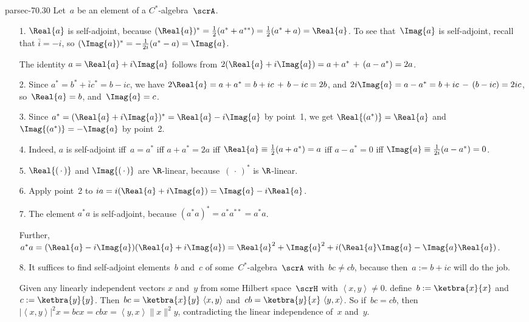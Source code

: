 \documentclass[b5page]{book}
\begin{document}
\begin{solution}{parsec-70.30}
Let~$a$ be an element of a $C^*$-algebra~$\scrA$.
\begin{enumerate}
    \item[1.]
$\Real{a}$ is self-adjoint, because
$(\Real{a})^*
        = \frac{1}{2}(a^{*}+a^{**}) = \frac{1}{2}(a^*+a) = \Real{a}$.
To see that~$\Imag{a}$ is self-adjoint, recall
        that $\bar{i}=-i$,
so
        $(\Imag{a})^*
        = -\frac{1}{2i}(a^*-a) 
        = \Imag{a}$.

The identity $a=\Real{a}+i\Imag{a}$
follows from
        $2(\Real{a}+i\Imag{a})
        = a+a^* \,+\, (a-a^*)
        = 2a$.
    \item[2.]
    Since $a^*=b^*+\bar{i}c^* =b-ic$,
        we have $2\Real{a}=a+a^* = b+ic\,+\,b-ic = 2b$,
        and $2i\Imag{a} = a-a^* = b+ic \,-\, (b-ic) = 2ic$,
        so~$\Real{a}=b$, and~$\Imag{a}=c$.

\item[3.]
Since $a^* = (\Real{a}+i\Imag{a})^*
        = \Real{a} - i\Imag{a}$ by point~1,
        we get $\Real{(a^*)}=\Real{a}$
        and $\Imag{(a^*)} = -\Imag{a}$ by point~2.

\item[4.]
Indeed,
$a$ is self-adjoint iff~$a=a^*$
        iff $a+a^*=2a$
        iff $\Real{a} \equiv \frac{1}{2}(a+a^*) = a$
        iff $a-a^* = 0$
        iff $\Imag{a}\equiv \frac{1}{2i}(a-a^*) = 0$.

\item[5.]
    $\Real{(\,\cdot\,)}$
        and $\Imag{(\,\cdot\,)}$
        are $\R$-linear,
        because~$(\,\cdot\,)^*$
        is $\R$-linear.

\item[6.]
    Apply point~2 to
    $ia = i(\Real{a}+i\Imag{a}) = \Imag{a}-i\Real{a}$.

\item[7.]
The element
$a^*a$ is self-adjoint,
        because $(a^*a)^*=a^*a^{**}=a^*a$.

Further,
        $a^*a = (\Real{a}-i\Imag{a})(\Real{a}+i\Imag{a})
        = \Real{a}^2 + \Imag{a}^2 + i(\Real{a}\Imag{a}-\Imag{a}\Real{a})$.

\item[8.]
It suffices to find self-adjoint elements~$b$ and~$c$
of some~$C^*$-algebra~$\scrA$ with~$bc\neq cb$,
because then~$a:= b+ic$ will do the job.

Given any linearly independent vectors
$x$ and~$y$
from some Hilbert space~$\scrH$
with $\left<x,y\right>\neq 0$.
define~$b:=\ketbra{x}{x}$ and $c:=\ketbra{y}{y}$.
Then~$bc = \ketbra{x}{y}\,\left<x,y\right> $
and~$cb=\ketbra{y}{x}\,\left<y,x\right>$.
So if~$bc=cb$,
then~$\left|\left<x,y\right>\right|^2x = bcx
= cbx = \left<y,x\right>\|x\|^2y$,
contradicting the linear independence of~$x$ and~$y$.


\end{enumerate}
\end{solution}
\end{document}
